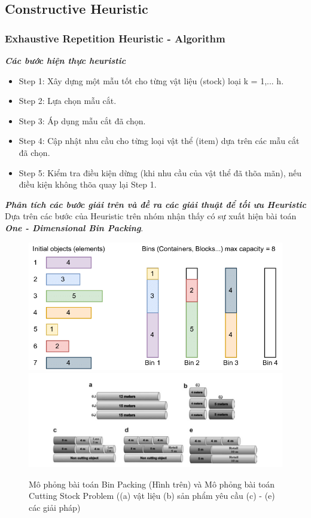 \documentclass[a4paper]{article}
\begin{document}
\subsection{Constructive Heuristic}
\subsubsection{Exhaustive Repetition Heuristic - Algorithm}
\indent \textbf{\textit{Các bước hiện thực heuristic}}
\begin{itemize}
    \item Step 1: Xây dựng một mẫu tốt cho từng vật liệu (stock) loại k = 1,... h.
    \item  Step 2: Lựa chọn mẫu cắt. 
    \item Step 3: Áp dụng mẫu cắt đã chọn.
    \item  Step 4: Cập nhật nhu cầu cho từng loại vật thể (item) dựa trên các mẫu cắt đã chọn. 
    \item  Step 5: Kiểm tra điều kiện dừng (khi nhu cầu của vật thể đã thõa mãn), nếu điều kiện không thõa quay lại Step 1.
\end{itemize}
\indent \textbf{\textit{Phân tích các bước giải trên và đề ra các giải thuật để tối ưu Heuristic}} \\
\indent Dựa trên các bước của Heuristic trên nhóm nhận thấy có sự xuất hiện bài toán \textbf{\textit{One - Dimensional Bin Packing}}.\\
\begin{figure}[http]
    \centering
    \includegraphics[width=0.5\linewidth]{Illustration-of-the-bin-packing-problem.png}
    \includegraphics[width=0.5\linewidth]{pattern_generation_image.jpg}
    \caption{Mô phỏng bài toán Bin Packing (Hình trên) và Mô phỏng bài toán Cutting Stock Problem ((a) vật liệu (b) sản phẩm yêu cầu (c) - (e) các giải pháp)}
    \label{fig:enter-label}
\end{figure}
\end{document}
